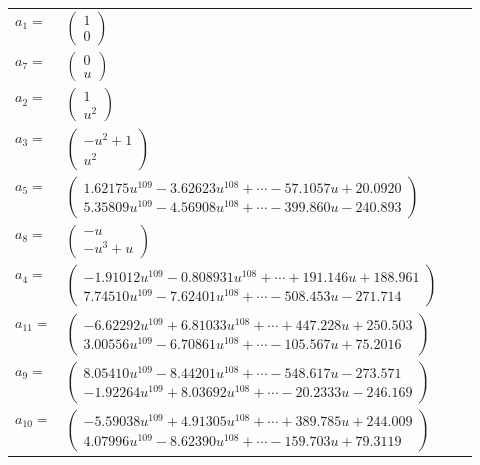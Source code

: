 \documentclass[1p]{elsarticle_modified}
\theoremstyle{definition}
\begin{document}
\begin{tabular}{m{7pt} m{180pt} m{7pt} m{180pt} }
\flushright $a_{1}=$&$\begin{pmatrix}1\\0\end{pmatrix}$ \\
\flushright $a_{7}=$&$\begin{pmatrix}0\\u\end{pmatrix}$ \\
\flushright $a_{2}=$&$\begin{pmatrix}1\\u^2\end{pmatrix}$ \\
\flushright $a_{3}=$&$\begin{pmatrix}- u^2+1\\u^2\end{pmatrix}$ \\
\flushright $a_{5}=$&$\begin{pmatrix}1.62175 u^{109}-3.62623 u^{108}+\cdots-57.1057 u+20.0920\\5.35809 u^{109}-4.56908 u^{108}+\cdots-399.860 u-240.893\end{pmatrix}$ \\
\flushright $a_{8}=$&$\begin{pmatrix}- u\\- u^3+u\end{pmatrix}$ \\
\flushright $a_{4}=$&$\begin{pmatrix}-1.91012 u^{109}-0.808931 u^{108}+\cdots+191.146 u+188.961\\7.74510 u^{109}-7.62401 u^{108}+\cdots-508.453 u-271.714\end{pmatrix}$ \\
\flushright $a_{11}=$&$\begin{pmatrix}-6.62292 u^{109}+6.81033 u^{108}+\cdots+447.228 u+250.503\\3.00556 u^{109}-6.70861 u^{108}+\cdots-105.567 u+75.2016\end{pmatrix}$ \\
\flushright $a_{9}=$&$\begin{pmatrix}8.05410 u^{109}-8.44201 u^{108}+\cdots-548.617 u-273.571\\-1.92264 u^{109}+8.03692 u^{108}+\cdots-20.2333 u-246.169\end{pmatrix}$ \\
\flushright $a_{10}=$&$\begin{pmatrix}-5.59038 u^{109}+4.91305 u^{108}+\cdots+389.785 u+244.009\\4.07996 u^{109}-8.62390 u^{108}+\cdots-159.703 u+79.3119\end{pmatrix}$ \\

\end{tabular}
\end{document}
